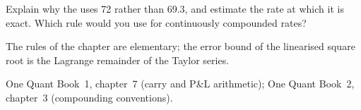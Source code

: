\begin{interviewq}\label{iq:iv:mental-arithmetic:14}
Explain why the  uses 72 rather than 69.3, and estimate the rate at which it is exact. Which rule
would you use for continuously compounded rates?
\end{interviewq}

\begin{omsources}
\item The rules of the chapter are elementary; the error bound of the linearised square root is the Lagrange
remainder of the Taylor series.
\item One Quant Book~1, chapter~7 (carry and P\&L arithmetic); One Quant Book~2, chapter~3 (compounding
conventions).
\end{omsources}
